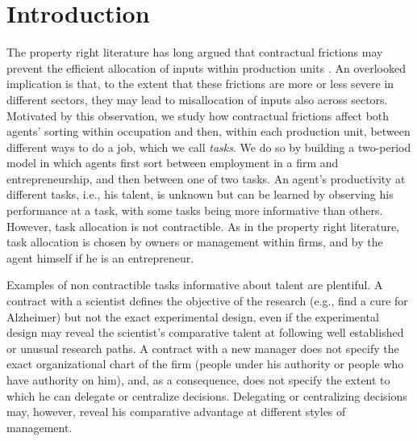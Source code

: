 \documentclass[12pt,american]{paper}
\theoremstyle{remark}
\begin{document}

\pagebreak
\section{Introduction}
The property right literature  has long argued that contractual frictions may prevent the efficient allocation of inputs within production units \citep{Grossman1986}. An overlooked implication is that, to the extent that these frictions are more or less severe in different sectors,  they may  lead to misallocation of inputs also across sectors. Motivated by this observation, we study how contractual frictions affect both agents' sorting within occupation and then, within each production unit, between different ways to do a job, which we call \textit{tasks}.   We do so by building a two-period model in which agents first sort between employment in a firm and entrepreneurship, and then between one of two tasks. An agent's productivity at different tasks, i.e., his talent, is unknown but can be learned by observing his performance at a task, with some tasks being more informative than others. However, task allocation is not contractible. As in the property right literature, task allocation is chosen by owners or management within firms, and by the  agent himself if he is an entrepreneur. 

Examples of non contractible tasks informative about talent are plentiful. A contract with a scientist defines the objective of the research (e.g., find a cure for Alzheimer) but not the exact experimental design, even if the experimental design may reveal the scientist's comparative talent at following well established or unusual research paths. A contract with a new manager does not specify the exact organizational chart of the firm (people under his authority or people who have authority on him), and, as a consequence, does not specify the extent to which he can delegate or centralize decisions. Delegating or centralizing decisions may, however, reveal his comparative advantage at different styles of management.
\end{document}
